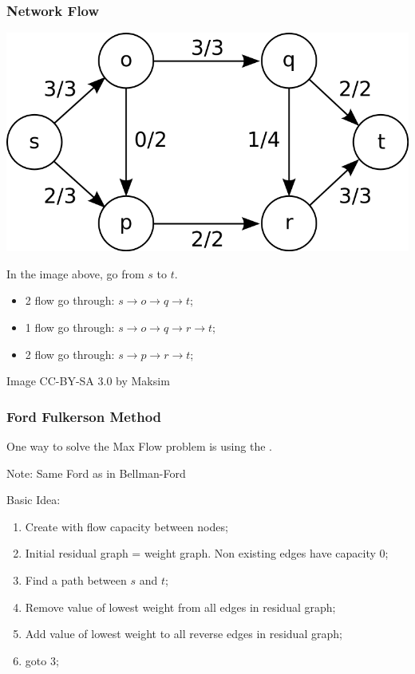 \documentclass{beamer}
\begin{document}
\begin{frame}
  \frametitle{Network Flow}
  \begin{center}
    \includegraphics[width=.55\textwidth]{../img/maxflow_wiki}
  \end{center}
  
  {\smaller
    In the image above,  go from $s$ to $t$.
    \begin{itemize}
    \item 2 flow go through: $s\rightarrow o\rightarrow q\rightarrow t$;
    \item 1 flow go through: $s\rightarrow o\rightarrow q\rightarrow r\rightarrow t$;
    \item 2 flow go through: $s\rightarrow p\rightarrow r\rightarrow t$;
    \end{itemize}
  }

  \hfill{\tiny Image CC-BY-SA 3.0 by Maksim}
\end{frame}


\begin{frame}
  \frametitle{Ford Fulkerson Method}

  {\smaller
  \begin{block}{}
    One way to solve the Max Flow problem is using the .

    \hfill {\tiny Note: Same Ford as in Bellman-Ford}
  \end{block}
  
  \medskip

  Basic Idea:
  \begin{enumerate}
  \item Create  with flow capacity between nodes;
  \item Initial residual graph = weight graph. Non existing edges have capacity 0;
  \item Find a path between $s$ and $t$;
  \item \alert{Remove value} of lowest weight from all edges in residual graph;
  \item \alert{Add value} of lowest weight to all reverse edges in residual graph;
  \item goto 3;
  \end{enumerate}}
\end{frame}
\end{document}

